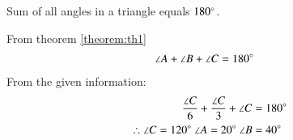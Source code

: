 \begin{theorem}\label{theorem:th1}
Sum of all angles in a triangle equals $180\degree$.
\end{theorem}
\solution  From theorem \ref{theorem:th1}
\begin{align}
\angle A + \angle B + \angle C &=  180\degree
\end{align}
From the given information:
\begin{align}
\frac{\angle C}{6} + \frac{\angle C}{3} + \angle C &=  180\degree\\
\therefore \angle C = 120\degree \ \angle A = 20\degree \ \angle B &= 40\degree \nonumber
\end{align}




